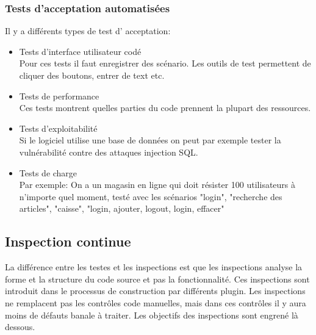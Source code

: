 \subsubsection{Tests d'acceptation automatisées}
Il y a différents types de test d' acceptation:
\begin{itemize}
 \item Tests d'interface utilisateur codé
 \\Pour ces tests il faut enregistrer des scénario. Les outils de test permettent de cliquer des boutons, entrer de text etc. 
 \item Tests de performance
 \\Ces tests montrent quelles parties du code prennent la plupart des ressources.
 \item Tests d'exploitabilité 
 \\Si le logiciel utilise une base de données on peut par exemple tester la vulnérabilité contre des attaques injection SQL.
 \item Tests de charge
 \\Par exemple: On a un magasin en ligne qui doit résister 100 utilisateurs à n'importe quel moment, testé avec les scénarios "login", "recherche des articles", "caisse", "login, ajouter, logout, login, effacer"
\end{itemize}





\subsection{Inspection continue}

La différence entre les testes et les inspections est que les inspections analyse la forme et la structure du code source et pas la fonctionnalité. Ces inspections sont introduit dans le processus de construction par différents plugin. Les inspections ne remplacent pas les contrôles code manuelles, mais dans ces contrôles il y aura moins de défauts banale à traiter. Les objectifs des inspections sont engrené là dessous.

